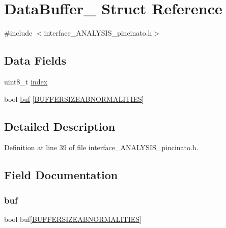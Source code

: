 \hypertarget{struct_data_buffer__}{}\section{Data\+Buffer\+\_\+ Struct Reference}
\label{struct_data_buffer__}


{\ttfamily \#include $<$interface\+\_\+\+A\+N\+A\+L\+Y\+S\+I\+S\+\_\+pincinato.\+h$>$}

\subsection*{Data Fields}
\begin{DoxyCompactItemize}
\item 
uint8\+\_\+t \mbox{\hyperlink{struct_data_buffer___aae5a12e607d0f782506d9e6ec6179c64}{index}}
\item 
bool \mbox{\hyperlink{struct_data_buffer___a414d502c8f0c1f140326e0acab1abac2}{buf}} \mbox{[}\mbox{\hyperlink{interface___a_n_a_l_y_s_i_s__pincinato_8h_a15298070513fb95a1e8c82f64628c9ac}{B\+U\+F\+F\+E\+R\+S\+I\+Z\+E\+A\+B\+N\+O\+R\+M\+A\+L\+I\+T\+I\+ES}}\mbox{]}
\end{DoxyCompactItemize}


\subsection{Detailed Description}


Definition at line 39 of file interface\+\_\+\+A\+N\+A\+L\+Y\+S\+I\+S\+\_\+pincinato.\+h.



\subsection{Field Documentation}
\mbox{\label{struct_data_buffer___a414d502c8f0c1f140326e0acab1abac2}} 
\subsubsection{\texorpdfstring{buf}{buf}}
{\footnotesize\ttfamily bool buf\mbox{[}\mbox{\hyperlink{interface___a_n_a_l_y_s_i_s__pincinato_8h_a15298070513fb95a1e8c82f64628c9ac}{B\+U\+F\+F\+E\+R\+S\+I\+Z\+E\+A\+B\+N\+O\+R\+M\+A\+L\+I\+T\+I\+ES}}\mbox{]}}



